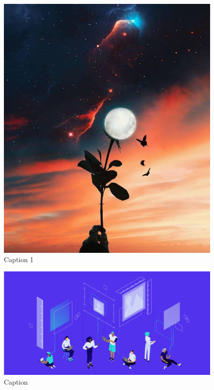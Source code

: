 \documentclass[10pt]{article}
\begin{document}
\begin{figure}  
    \centering
    \includegraphics[width=\linewidth]{Imagenes/ImgEj1.jpg} 
    \caption{Caption 1}
    \label{fig:wrapfig}
\end{figure}

\lipsum[4][1-10]

\lipsum[8]

\lipsum[10][1-6]

\begin{figure}[h!]
    \centering
    \includegraphics[scale=0.2, angle=4]{Imagenes/ImgEj2.png}
    \caption{Caption}
    \label{fig:my_label}
\end{figure}
\end{document}
